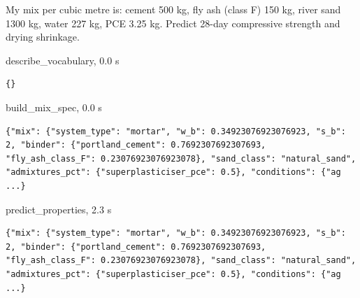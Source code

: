 \begin{userbox}
My mix per cubic metre is: cement 500 kg, fly ash (class F) 150 kg, river sand 1300 kg, water 227 kg, PCE 3.25 kg. Predict 28-day compressive strength and drying shrinkage.
\end{userbox}
\begin{toolbox}{describe\_vocabulary, 0.0 s}
\begin{lstlisting}[style=argstyle]
{}
\end{lstlisting}
\end{toolbox}
\begin{toolbox}{build\_mix\_spec, 0.0 s}
\begin{lstlisting}[style=argstyle]
{"mix": {"system_type": "mortar", "w_b": 0.34923076923076923, "s_b": 2, "binder": {"portland_cement": 0.7692307692307693, "fly_ash_class_F": 0.23076923076923078}, "sand_class": "natural_sand", "admixtures_pct": {"superplasticiser_pce": 0.5}, "conditions": {"ag ...}
\end{lstlisting}
\end{toolbox}
\begin{toolbox}{predict\_properties, 2.3 s}
\begin{lstlisting}[style=argstyle]
{"mix": {"system_type": "mortar", "w_b": 0.34923076923076923, "s_b": 2, "binder": {"portland_cement": 0.7692307692307693, "fly_ash_class_F": 0.23076923076923078}, "sand_class": "natural_sand", "admixtures_pct": {"superplasticiser_pce": 0.5}, "conditions": {"ag ...}
\end{lstlisting}
\end{toolbox}
